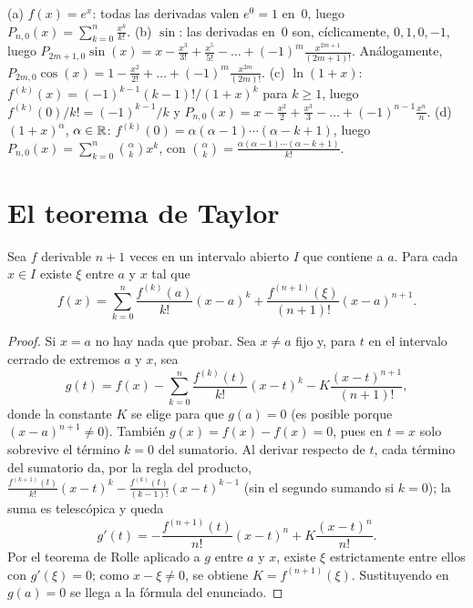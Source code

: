 \begin{ejemplo}\label{ej:maclaurin}
(a) $f(x)=e^{x}$: todas las derivadas valen $e^{0}=1$ en~0, luego $P_{n,0}(x)=\sum_{k=0}^{n}\frac{x^{k}}{k!}$.
(b) $\sin$: las derivadas en~0 son, cíclicamente, $0,1,0,-1$, luego $P_{2m+1,0}\sin(x)=x-\frac{x^{3}}{3!}+\frac{x^{5}}{5!}-\dots+(-1)^{m}\frac{x^{2m+1}}{(2m+1)!}$. Análogamente, $P_{2m,0}\cos(x)=1-\frac{x^{2}}{2!}+\dots+(-1)^{m}\frac{x^{2m}}{(2m)!}$.
(c) $\ln(1+x)$: $f^{(k)}(x)=(-1)^{k-1}(k-1)!/(1+x)^{k}$ para $k\ge1$, luego $f^{(k)}(0)/k!=(-1)^{k-1}/k$ y $P_{n,0}(x)=x-\frac{x^{2}}{2}+\frac{x^{3}}{3}-\dots+(-1)^{n-1}\frac{x^{n}}{n}$.
(d) $(1+x)^{\alpha}$, $\alpha\in\mathbb{R}$: $f^{(k)}(0)=\alpha(\alpha-1)\cdots(\alpha-k+1)$, luego $P_{n,0}(x)=\sum_{k=0}^{n}\binom{\alpha}{k}x^{k}$, con $\binom{\alpha}{k}=\frac{\alpha(\alpha-1)\cdots(\alpha-k+1)}{k!}$.
\end{ejemplo}

\section{El teorema de Taylor}

\begin{teorema}\label{teo:taylor}
Sea $f$ derivable $n+1$ veces en un intervalo abierto $I$ que contiene a $a$. Para cada $x\in I$ existe $\xi$ entre $a$ y $x$ tal que
\[
f(x)=\sum_{k=0}^{n}\frac{f^{(k)}(a)}{k!}(x-a)^{k}+\frac{f^{(n+1)}(\xi)}{(n+1)!}(x-a)^{n+1}.
\]
\end{teorema}

\begin{proof}
Si $x=a$ no hay nada que probar. Sea $x\ne a$ fijo y, para $t$ en el intervalo cerrado de extremos $a$ y $x$, sea
\[
g(t)=f(x)-\sum_{k=0}^{n}\frac{f^{(k)}(t)}{k!}(x-t)^{k}-K\frac{(x-t)^{n+1}}{(n+1)!},
\]
donde la constante $K$ se elige para que $g(a)=0$ (es posible porque $(x-a)^{n+1}\ne0$). También $g(x)=f(x)-f(x)=0$, pues en $t=x$ solo sobrevive el término $k=0$ del sumatorio. Al derivar respecto de $t$, cada término del sumatorio da, por la regla del producto, $\frac{f^{(k+1)}(t)}{k!}(x-t)^{k}-\frac{f^{(k)}(t)}{(k-1)!}(x-t)^{k-1}$ (sin el segundo sumando si $k=0$); la suma es telescópica y queda
\[
g'(t)=-\frac{f^{(n+1)}(t)}{n!}(x-t)^{n}+K\frac{(x-t)^{n}}{n!}.
\]
Por el teorema de Rolle aplicado a $g$ entre $a$ y $x$, existe $\xi$ estrictamente entre ellos con $g'(\xi)=0$; como $x-\xi\ne0$, se obtiene $K=f^{(n+1)}(\xi)$. Sustituyendo en $g(a)=0$ se llega a la fórmula del enunciado.
\end{proof}

